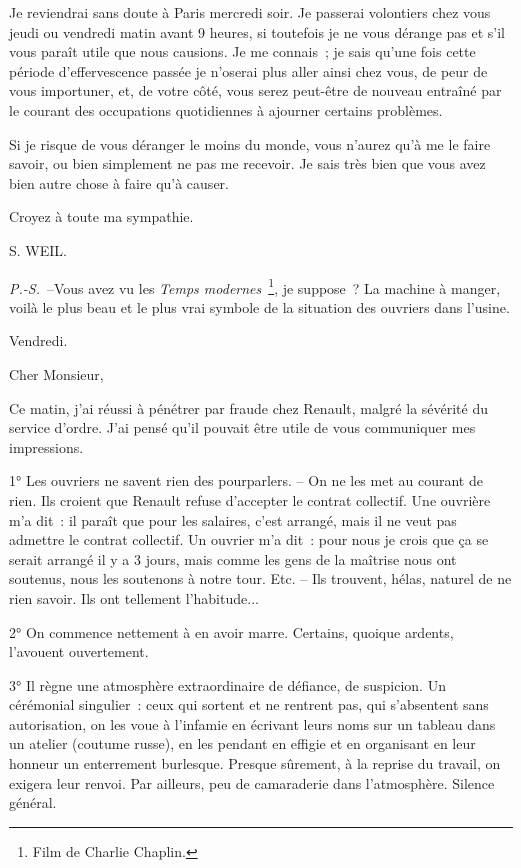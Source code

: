 \documentclass[french,twoside]{book} %
\begin{document}
Je reviendrai sans doute à Paris mercredi soir. Je passerai volontiers chez vous jeudi ou vendredi matin avant 9 heures, si toutefois je ne vous dérange pas et s'il vous paraît utile que nous causions. Je me connais ; je sais qu'une fois cette période d'effervescence passée je n'oserai plus aller ainsi chez vous, de peur de vous importuner, et, de votre côté, vous serez peut-être de nouveau entraîné par le courant des occupations quotidiennes à ajourner certains problèmes.\par
Si je risque de vous déranger le moins du monde, vous n'aurez qu'à me le faire savoir, ou bien simplement ne pas me recevoir. Je sais très bien que vous avez bien autre chose à faire qu'à causer.\par
Croyez à toute ma sympathie.\par
S. WEIL.\par
{\itshape P.-S.} –Vous avez vu les {\itshape Temps modernes} \footnote{Film de Charlie Chaplin.}, je suppose ? La machine à manger, voilà le plus beau et le plus vrai symbole de la situation des ouvriers dans l'usine.\par
\noindent Vendredi.\par
\noindent Cher Monsieur,\par
Ce matin, j'ai réussi à pénétrer par fraude chez Renault, malgré la sévérité du service d'ordre. J'ai pensé qu'il pouvait être utile de vous communiquer mes impressions.\par
1° Les ouvriers ne savent rien des pourparlers. – On ne les met au courant de rien. Ils croient que Renault refuse d'accepter le contrat collectif. Une ouvrière m'a dit : il paraît que pour les salaires, c'est arrangé, mais il ne veut pas admettre le contrat collectif. Un ouvrier m'a dit : pour nous je crois que ça se serait arrangé il y a 3 jours, mais comme les gens de la maîtrise nous ont soutenus, nous les soutenons à notre tour. Etc. – Ils trouvent, hélas, naturel de ne rien savoir. Ils ont tellement l'habitude...\par
2° On commence nettement à en avoir marre. Certains, quoique ardents, l'avouent ouvertement.\par
3° Il règne une atmosphère extraordinaire de défiance, de suspicion. Un cérémonial singulier : ceux qui sortent et ne rentrent pas, qui s'absentent sans autorisation, on les voue à l'infamie en écrivant leurs noms sur un tableau dans un atelier (coutume russe), en les pendant en effigie et en organisant en leur honneur un enterrement burlesque. Presque sûrement, à la reprise du travail, on exigera leur renvoi. Par ailleurs, peu de camaraderie dans l'atmosphère. Silence général.\par
\end{document}
